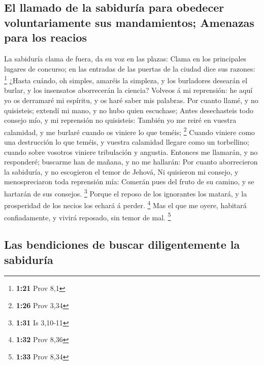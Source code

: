 \hypertarget{el-llamado-de-la-sabiduruxeda-para-obedecer-voluntariamente-sus-mandamientos-amenazas-para-los-reacios}{%
\subsection{El llamado de la sabiduría para obedecer voluntariamente sus
mandamientos; Amenazas para los
reacios}\label{el-llamado-de-la-sabiduruxeda-para-obedecer-voluntariamente-sus-mandamientos-amenazas-para-los-reacios}}

 La sabiduría clama de fuera, da su voz en las plazas:
 Clama en los principales lugares de concurso; en las
entradas de las puertas de la ciudad dice sus razones: \footnote{\textbf{1:21}
  Prov 8,1}  ¿Hasta cuándo, oh simples, amaréis la
simpleza, y los burladores desearán el burlar, y los insensatos
aborrecerán la ciencia?  Volveos á mi reprensión: he aquí
yo os derramaré mi espíritu, y os haré saber mis palabras.
 Por cuanto llamé, y no quisisteis; extendí mi mano, y no
hubo quien escuchase;  Antes desechasteis todo consejo
mío, y mi reprensión no quisisteis:  También yo me reiré
en vuestra calamidad, y me burlaré cuando os viniere lo que teméis;
\footnote{\textbf{1:26} Prov 3,34}  Cuando viniere como
una destrucción lo que teméis, y vuestra calamidad llegare como un
torbellino; cuando sobre vosotros viniere tribulación y angustia.
 Entonces me llamarán, y no responderé; buscarme han de
mañana, y no me hallarán:  Por cuanto aborrecieron la
sabiduría, y no escogieron el temor de Jehová,  Ni
quisieron mi consejo, y menospreciaron toda reprensión mía:
 Comerán pues del fruto de su camino, y se hartarán de
sus consejos. \footnote{\textbf{1:31} Is 3,10-11}  Porque
el reposo de los ignorantes los matará, y la prosperidad de los necios
los echará á perder. \footnote{\textbf{1:32} Prov 8,36} 
Mas el que me oyere, habitará confiadamente, y vivirá reposado, sin
temor de mal. \footnote{\textbf{1:33} Prov 8,34}

\hypertarget{las-bendiciones-de-buscar-diligentemente-la-sabiduruxeda}{%
\subsection{Las bendiciones de buscar diligentemente la
sabiduría}\label{las-bendiciones-de-buscar-diligentemente-la-sabiduruxeda}}

